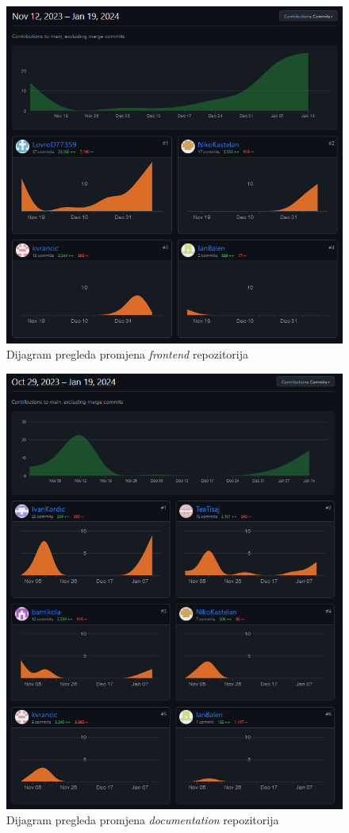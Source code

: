 		\begin{figure}[h!]
		    \centering
 		   \includegraphics[width=\textwidth]{slike/frontendGitHub.png} 
		    \caption{Dijagram pregleda promjena \textit{frontend} repozitorija}
 		   \label{fig:my_image}
		\end{figure}
		
	
		\begin{figure}[h!]
 		   \centering
  		  \includegraphics[width=\textwidth]{slike/documentationGitHub.png} 
   		 \caption{Dijagram pregleda promjena \textit{documentation} repozitorija}
   		 \label{fig:my_image}
		\end{figure}
		\eject
  
		
	
